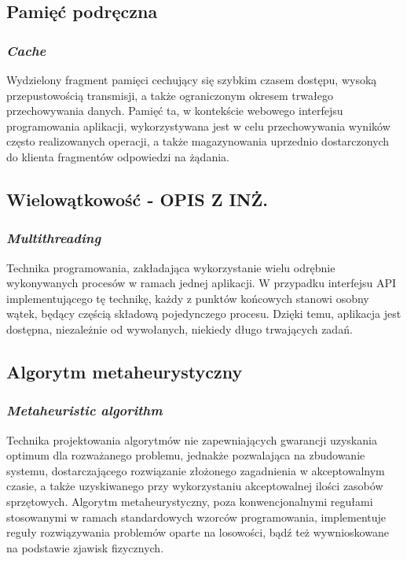 \subsection*{Pamięć podręczna}
\subsubsection{\textit{Cache}}
Wydzielony fragment pamięci cechujący się szybkim czasem dostępu, wysoką przepustowością transmisji, a także ograniczonym okresem trwałego przechowywania danych. Pamięć ta, w kontekście webowego interfejsu programowania aplikacji, wykorzystywana jest w celu przechowywania wyników często realizowanych operacji, a także magazynowania uprzednio dostarczonych do klienta fragmentów odpowiedzi na żądania.

\subsection*{Wielowątkowość - OPIS Z INŻ.}
\subsubsection{\textit{Multithreading}}
Technika programowania, zakładająca wykorzystanie wielu odrębnie wykonywanych procesów w ramach jednej aplikacji. W przypadku interfejsu API implementującego tę technikę, każdy z punktów końcowych stanowi osobny wątek, będący częścią składową pojedynczego procesu. Dzięki temu, aplikacja jest dostępna, niezależnie od wywołanych, niekiedy długo trwających zadań.

\subsection*{Algorytm metaheurystyczny}
\subsubsection{\textit{Metaheuristic algorithm}}
Technika projektowania algorytmów nie zapewniających gwarancji uzyskania optimum dla rozważanego problemu, jednakże pozwalająca na zbudowanie systemu, dostarczającego rozwiązanie złożonego zagadnienia w akceptowalnym czasie, a także uzyskiwanego przy wykorzystaniu akceptowalnej ilości zasobów sprzętowych. Algorytm metaheurystyczny, poza konwencjonalnymi regułami stosowanymi w ramach standardowych wzorców programowania, implementuje reguły rozwiązywania problemów oparte na losowości, bądź też wywnioskowane na podstawie zjawisk fizycznych.

